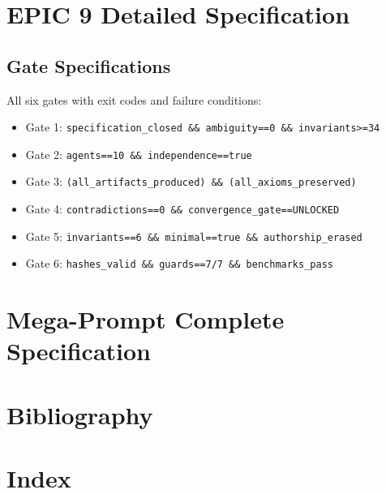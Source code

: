 \documentclass[12pt,oneside,a4paper]{book}
\theoremstyle{definition}
\begin{document}
\chapter{EPIC 9 Detailed Specification}
\label{app:epic9-spec}


\section{Gate Specifications}
\label{app:epic9-gates}

All six gates with exit codes and failure conditions:

\begin{itemize}
  \item Gate 1: \texttt{specification\_closed \&\& ambiguity==0 \&\& invariants>=34}
  \item Gate 2: \texttt{agents==10 \&\& independence==true}
  \item Gate 3: \texttt{(all\_artifacts\_produced) \&\& (all\_axioms\_preserved)}
  \item Gate 4: \texttt{contradictions==0 \&\& convergence\_gate==UNLOCKED}
  \item Gate 5: \texttt{invariants==6 \&\& minimal==true \&\& authorship\_erased}
  \item Gate 6: \texttt{hashes\_valid \&\& guards==7/7 \&\& benchmarks\_pass}
\end{itemize}

\chapter{Mega-Prompt Complete Specification}
\label{app:mega-prompt}


\chapter{Bibliography}
\label{app:bibliography}

\newpage

\printbibliography

\chapter{Index}
\label{app:index}

\printindex

\end{document}
